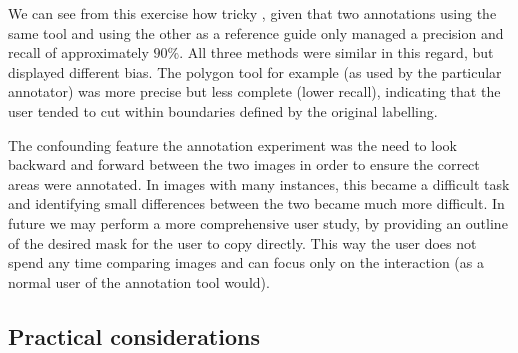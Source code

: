 We can see from this exercise how tricky , given that two annotations using the same tool and using the other as a reference guide only managed a precision and recall of approximately $ 90\% $. All three methods were similar in this regard, but displayed different bias. The polygon tool for example (as used by the particular annotator) was more precise but less complete (lower recall), indicating that the user tended to cut within boundaries defined by the original labelling. 




\begin{table*}[!ht]
  \centering
    \caption{Statistics from annotating validation set in different ways. Precision, recall and IOU are a comparison with the original validation set. Note figures in brackets are the original statistics of the un-modified predictions from the model}

\noindent{}

\label{tab:annotation_exp}
\end{table*}


The confounding feature the annotation experiment was the need to look backward and forward between the two images in order to ensure the correct areas were annotated. In images with many instances, this became a difficult task and identifying small differences between the two became much more difficult. In future we may perform a more comprehensive user study, by providing an outline of the desired mask for the user to copy directly. This way the user does not spend any time comparing images and can focus only on the interaction (as a normal user of the annotation tool would).


\subsection{Practical considerations}

